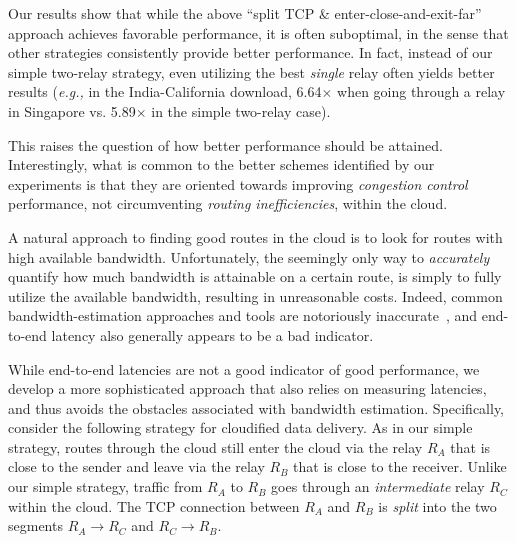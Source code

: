 \documentclass{hotnets17}
\newcommand{\mycomm}[3]{{\color{#2} \textbf{[#1: #3]}}}
\newcommand{\mycomm}[3]{}
\newcommand{\AB}[1]{\mycomm{AB}{Orange}{#1}}
\newcommand{\NR}[1]{\mycomm{NR}{OliveGreen}{#1}}
\providecommand{\vs}{vs. }
\providecommand{\eg}{\emph{e.g.,} }
\begin{document}
\vspace{0.05in} %
Our results show that while the above ``split TCP \& enter-close-and-exit-far'' approach achieves favorable performance, it is often suboptimal, in the sense that other strategies consistently provide better performance.  
In fact, instead of our simple two-relay strategy, even utilizing the best \emph{single} relay often yields better results (\eg in the India-California download, 6.64$\times$ when going through a relay in Singapore \vs 5.89$\times$ in the simple two-relay case). %

This raises the question of how better performance should be attained. Interestingly, what is common to the better schemes identified by our experiments is that they are oriented towards 
improving \emph{congestion control} performance, not circumventing \emph{routing inefficiencies}, within the cloud.

\vspace{0.05in} %
A natural approach to finding good routes in the cloud is to look for routes with high available bandwidth. Unfortunately,
the seemingly only way to \emph{accurately} quantify how much bandwidth is attainable on a certain route, is simply to fully utilize the available bandwidth, resulting in unreasonable costs. Indeed, common bandwidth-estimation approaches and tools are notoriously inaccurate~\cite{CRONets,tools}, and end-to-end latency also generally appears to be a bad indicator. 

While end-to-end latencies are not a good indicator of good performance, we develop a more sophisticated approach that also relies on measuring latencies, and thus avoids the obstacles associated with bandwidth estimation. %
Specifically, consider the following strategy for cloudified data delivery. As in our simple strategy, routes through the cloud still enter the cloud via the relay $R_A$ that is close to the sender and leave via the relay $R_B$ that is close to the receiver. Unlike our simple strategy, traffic from $R_A$ to $R_B$ goes through an \emph{intermediate} relay $R_C$ within the cloud. The TCP connection between $R_A$ and $R_B$ is \textit{split} into the two segments $R_A \to R_C$ and $R_C \to R_B$. 
\end{document}
